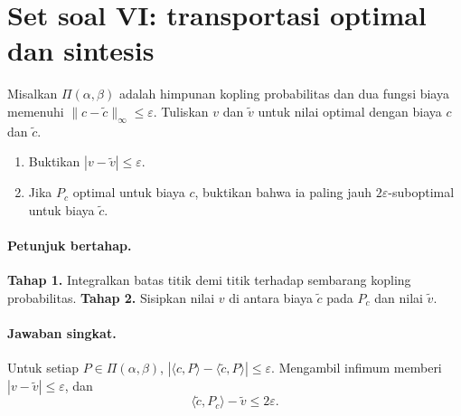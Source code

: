 
\section{Set soal VI: transportasi optimal dan sintesis}
\label{orig03:ps06}

\begin{exercise}
\label{orig03:ps06:exercise:0001}
Misalkan $\Pi(\alpha,\beta)$ adalah himpunan kopling probabilitas dan dua
fungsi biaya memenuhi
$\lVert c-\widetilde c\rVert_\infty\le\varepsilon$. Tuliskan $v$ dan
$\widetilde v$ untuk nilai optimal dengan biaya $c$ dan $\widetilde c$.

\begin{enumerate}
  \item Buktikan $|v-\widetilde v|\le\varepsilon$.
  \item Jika $P_c$ optimal untuk biaya $c$, buktikan bahwa ia paling jauh
  $2\varepsilon$-suboptimal untuk biaya $\widetilde c$.
\end{enumerate}
\end{exercise}

\paragraph{Petunjuk bertahap.}
\label{orig03:ps06:hint:0001}
\textbf{Tahap 1.} Integralkan batas titik demi titik terhadap sembarang kopling
probabilitas.
\textbf{Tahap 2.} Sisipkan nilai $v$ di antara biaya
$\widetilde c$ pada $P_c$ dan nilai $\widetilde v$.

\paragraph{Jawaban singkat.}
\label{orig03:ps06:answer:0001}
Untuk setiap $P\in\Pi(\alpha,\beta)$,
$|\langle c,P\rangle-\langle\widetilde c,P\rangle|\le\varepsilon$.
Mengambil infimum memberi $|v-\widetilde v|\le\varepsilon$, dan
\[
 \langle\widetilde c,P_c\rangle-\widetilde v\le2\varepsilon.
\]

